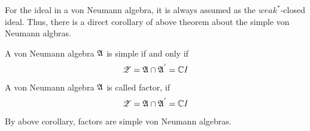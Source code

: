 \documentclass[a4paper,11pt]{report}
\begin{document}
For the ideal in a von Neumann algebra, it is always assumed as the $weak^*$-closed ideal. Thus, there is a direct corollary of above theorem about the simple von Neumann algbras.

\begin{cor}
		A von Neumann algebra $\mathfrak{A}$ is simple if and only if 
		\begin{equation*}
			\mathscr{Z} = \mathfrak{A} \cap \mathfrak{A}^{'} = \mathbb{C} I
		\end{equation*}
\end{cor}

\begin{defn}
	A von Neumann algebra $\mathfrak{A}$ is called factor, if 
	\begin{equation*}
		\mathscr{Z} = \mathfrak{A} \cap \mathfrak{A}^{'} = \mathbb{C} I
	\end{equation*}
\end{defn}
\begin{rem}
	By above corollary, factors are simple von Neumann algebras.
\end{rem}
\end{document}
